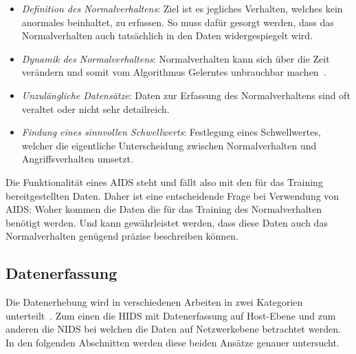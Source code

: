                 \begin{itemize}
                    \item \textit{Definition des Normalverhaltens}:
                        Ziel ist es jegliches Verhalten, welches kein anormales beinhaltet, zu erfassen.
                        So muss dafür gesorgt werden,
                        dass das Normalverhalten auch tatsächlich in den Daten widergespiegelt wird. 

                    \item \textit{Dynamik des Normalverhaltens}:
                        Normalverhalten kann sich über die Zeit verändern 
                        und somit vom Algorithmus Gelerntes unbrauchbar machen~\cite{ANOMALYSURVEY}.

                    \item \textit{Unzulängliche Datensätze}:
                        Daten zur Erfassung des Normalverhaltens sind oft veraltet oder nicht sehr detailreich. 

                    \item \textit{Findung eines sinnvollen Schwellwerts}:
                        Festlegung eines Schwellwertes, welcher die eigentliche Unterscheidung zwischen Normalverhalten und Angriffsverhalten umsetzt.
                \end{itemize}

                Die Funktionalität eines \ac{AIDS} steht und fällt also mit den für das Training bereitgestellten Daten.
                Daher ist eine entscheidende Frage bei Verwendung von \ac{AIDS}\@: Woher kommen die Daten die für das Training des Normalverhalten benötigt werden.
                Und kann gewährleistet werden, dass diese Daten auch das Normalverhalten genügend präzise beschreiben können.

        \subsection{Datenerfassung}\label{sec:Datenerfassung}
            Die Datenerhebung wird in verschiedenen Arbeiten in zwei Kategorien unterteilt~\cite{IDSsurvey, IDSreview}.
            Zum einen die \ac{HIDS} mit Datenerfassung auf Host-Ebene und zum anderen die \ac{NIDS} bei welchen die Daten auf Netzwerkebene betrachtet werden.
            In den folgenden Abschnitten werden diese beiden Ansätze genauer untersucht.

